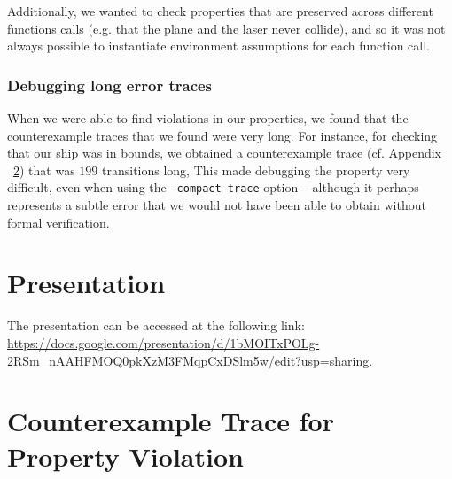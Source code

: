 \documentclass{article}
\begin{document}
            Additionally, we wanted to check properties that are preserved
            across different functions calls (e.g. that the plane and the laser
            never collide), and so it was not always possible to instantiate
            environment assumptions for each function call.

        \subsubsection{Debugging long error traces}

            When we were able to find violations in our properties, we found
            that the counterexample traces that we found were very long. For
            instance, for checking that our ship was in bounds, we obtained a
            counterexample trace (cf. Appendix ~\ref{appendix:trace}) that was
            $199$ transitions long, This made debugging the property very
            difficult, even when using the \texttt{--compact-trace} option --
            although it perhaps represents a subtle error that we would not have
            been able to obtain without formal verification.

\section{Presentation}

    The presentation can be accessed at the following link:
    \url{https://docs.google.com/presentation/d/1bMOITxPOLg-2RSm_nAAHFMOQ0pkXzM3FMqpCxDSlm5w/edit?usp=sharing}.




\appendix
\section{Counterexample Trace for Property Violation}
\label{appendix:trace}

\end{document}
